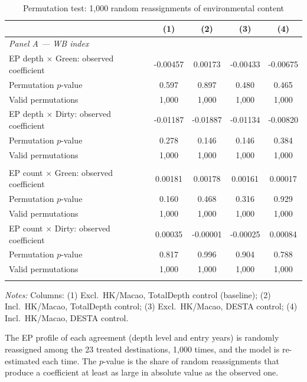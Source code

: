 \begin{table}[htbp]
\centering
\footnotesize
\caption{Permutation test: 1,000 random reassignments of environmental content}
\label{tab:perm}
\begin{threeparttable}
\begin{tabular}{lcccc}
\toprule
 & (1) & (2) & (3) & (4) \\
\midrule
\multicolumn{5}{l}{\textit{Panel A --- WB index}} \\
\addlinespace
EP depth $\times$ Green: observed coefficient & -0.00457 & 0.00173 & -0.00433 & -0.00675 \\
\quad Permutation $p$-value & 0.597 & 0.897 & 0.480 & 0.465 \\
\quad Valid permutations & 1,000 & 1,000 & 1,000 & 1,000 \\
\addlinespace
EP depth $\times$ Dirty: observed coefficient & -0.01187 & -0.01887 & -0.01134 & -0.00820 \\
\quad Permutation $p$-value & 0.278 & 0.146 & 0.146 & 0.384 \\
\quad Valid permutations & 1,000 & 1,000 & 1,000 & 1,000 \\
\addlinespace
\multicolumn{5}{l}{\textit{Panel B --- TREND index}} \\
\addlinespace
EP count $\times$ Green: observed coefficient & 0.00181 & 0.00178 & 0.00161 & 0.00017 \\
\quad Permutation $p$-value & 0.160 & 0.468 & 0.316 & 0.929 \\
\quad Valid permutations & 1,000 & 1,000 & 1,000 & 1,000 \\
\addlinespace
EP count $\times$ Dirty: observed coefficient & 0.00035 & -0.00001 & -0.00025 & 0.00084 \\
\quad Permutation $p$-value & 0.817 & 0.996 & 0.904 & 0.788 \\
\quad Valid permutations & 1,000 & 1,000 & 1,000 & 1,000 \\
\addlinespace
\bottomrule
\end{tabular}
\begin{tablenotes}[flushleft]\footnotesize
\item \emph{Notes:} Columns: (1) Excl.\ HK/Macao, TotalDepth control (baseline); (2) Incl.\ HK/Macao, TotalDepth control; (3) Excl.\ HK/Macao, DESTA control; (4) Incl.\ HK/Macao, DESTA control.
\item The EP profile of each agreement (depth level and entry years) is randomly reassigned among the 23 treated destinations, 1,000 times, and the model is re-estimated each time. The $p$-value is the share of random reassignments that produce a coefficient at least as large in absolute value as the observed one.

\end{tablenotes}
\end{threeparttable}
\end{table}
